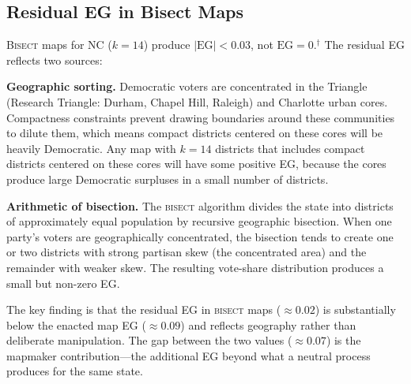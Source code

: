 \subsection{Residual EG in Bisect Maps}

\textsc{Bisect} maps for NC ($k=14$) produce $|\text{EG}| < 0.03$, not $\text{EG}=0$.$^\dagger$
The residual EG reflects two sources:

\textbf{Geographic sorting.} Democratic voters are concentrated in the Triangle
(Research Triangle: Durham, Chapel Hill, Raleigh) and Charlotte urban cores.
Compactness constraints prevent drawing boundaries around these communities
to dilute them, which means compact districts centered on these cores will be
heavily Democratic. Any map with $k=14$ districts that includes compact districts
centered on these cores will have some positive EG, because the cores produce
large Democratic surpluses in a small number of districts.

\textbf{Arithmetic of bisection.} The \textsc{bisect} algorithm divides the state
into districts of approximately equal population by recursive geographic bisection.
When one party's voters are geographically concentrated, the bisection tends to
create one or two districts with strong partisan skew (the concentrated area)
and the remainder with weaker skew. The resulting vote-share distribution
produces a small but non-zero EG.

The key finding is that the residual EG in \textsc{bisect} maps ($\approx 0.02$)
is substantially below the enacted map EG ($\approx 0.09$) and reflects geography
rather than deliberate manipulation. The gap between the two values ($\approx 0.07$)
is the mapmaker contribution---the additional EG beyond what a neutral process
produces for the same state.

